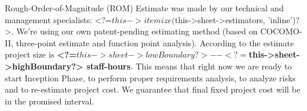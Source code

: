 
Rough-Order-of-Magnitude (ROM) Estimate was made by our technical and 
management specialists: 
<?=$this->itemize($this->sheet->estimators, 'inline')?>.
We're using our own patent-pending estimating method (based on COCOMO-II, 
three-point estimate and function point analysis).
According to the estimate
project size is
\textbf{<?=$this->sheet->lowBoundary?>--<?=$this->sheet->highBoundary?>{} staff-hours}. 
This means that right now we are ready to start Inception Phase,
to perform proper requirements analysis, 
to analyze risks and to re-estimate project cost.
We guarantee that final fixed project cost will be in the promised interval.
